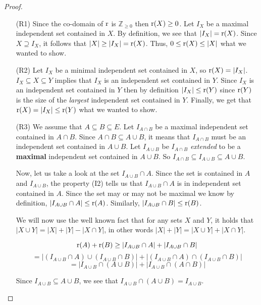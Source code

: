 \begin{proof}
    \begin{enumerate}
        \item[(R1)] Since the co-domain of $\operatorname{r}$ is $\mathbb{Z}_{\geq0}$ then  $\operatorname{r}(X) \geq 0$. Let $I_X$ be a maximal independent set contained in $X$. By definition, we see that $|I_X|=\operatorname{r}(X)$. Since $X\supseteq I_X$, it follows that $|X| \geq |I_X| = \operatorname{r}(X)$.       Thus, $0\leq\operatorname{r}(X)\leq|X|$ what we wanted to show.
        
        \item[(R2)] Let $I_X$ be a minimal independent set contained in $X$, so $\operatorname{r}(X)=|I_X|$. $I_X\subseteq X\subseteq Y$ implies that $I_X$ is an independent set contained in $Y$. Since $I_X$ is an independent set contained in $Y$ then by definition $|I_X|\leq \operatorname{r}(Y)$ since $\operatorname{r}(Y)$ is the size of the \textit{largest} independent set contained in $Y$. Finally, we get that $\operatorname{r}(X)=|I_X|\leq \operatorname{r}(Y)$ what we wanted to show.
        
        \item[(R3)] We assume that $A\subseteq B\subseteq E$. Let $I_{A\cap B}$ be a maximal independent set contained in $A\cap B$. Since $A\cap B\subseteq A\cup B$, it means that $I_{A\cap B}$ must be an independent set contained in $A\cup B$. Let $I_{A\cup B}$ be $I_{A\cap B}$ \textit{extended} to be a \textbf{maximal} independent set contained in $A\cup B$. So $I_{A\cap B}\subseteq I_{A\cup B} \subseteq A\cup B$. 
        
        Now, let us take a look at the set $I_{A\cup B}\cap A$. Since the set is contained in $A$ and $I_{A\cup B}$, the property (I2) tells us that $I_{A\cup B}\cap A$ is in independent set contained in $A$. Since the set may or may not be maximal we know by definition, $|I_{A\cup B}\cap A|\leq \operatorname{r}(A)$. Similarly, $|I_{A\cup B}\cap B|\leq \operatorname{r}(B) $.

        We will now use the well known fact that for any sets $X$ and $Y$, it holds that $|X\cup Y|=|X|+|Y|-|X\cap Y|$, in other words $|X|+|Y|=|X\cup Y|+|X\cap Y|$.
        
        $$ \operatorname{r}(A)+\operatorname{r}(B) \geq |I_{A\cup B}\cap A|+|I_{A\cup B}\cap B| $$
        $$ = |(I_{A\cup B}\cap A)\cup(I_{A\cup B}\cap B)|+|(I_{A\cup B}\cap A)\cap(I_{A\cup B}\cap B)| $$
        $$ = |I_{A\cup B}\cap (A\cup B)|+|I_{A\cup B}\cap (A\cap B)| $$

        Since $I_{A\cup B}\subseteq A\cup B$, we see that $I_{A\cup B}\cap(A\cup B) = I_{A\cup B}$.


\end{enumerate}
\end{proof}
